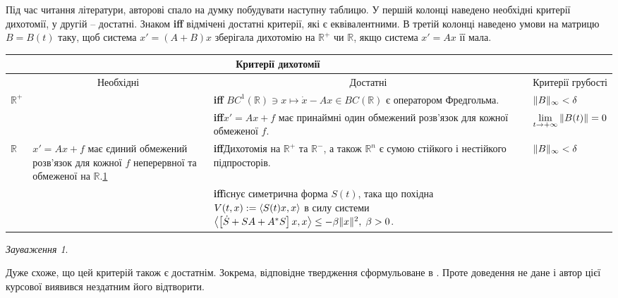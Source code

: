 \documentclass[14pt]{extarticle} %
\theoremstyle{remark}
\newtheorem{remark}{Зауваження}
\begin{document}
Під час читання літератури, авторові спало на думку побудувати наступну таблицю. У першій колонці наведено необхідні критерії
дихотомії, у другій -- достатні. Знаком \textbf{iff} відмічені достатні критерії, які є еквівалентними. В третій колонці
наведено умови на матрицю $B=B(t)$ таку, щоб система $x'=(A+B)x$ зберігала дихотомію на $\mathbb{R}^+$ чи $\mathbb{R}$, якщо
система $x'=Ax$ її мала.
\begin{center}
\newcommand{\mygraycenteredcell}[1]{\multicolumn{1}{c|}{\cellcolor{gray}#1}}
\newcommand{\mygraycenteredcello}{\cellcolor{gray}}

\begin{tabular}{ |l| p{} | p{} | p{}| }
	\mygraycenteredcello&\multicolumn{2}{c|}{\cellcolor{gray}Критерії дихотомії}&\mygraycenteredcello\\\hline
&\mygraycenteredcell{Необхідні}&\mygraycenteredcell{Достатні}&\mygraycenteredcell{Критерії грубості}\\\hline\hline

$\mathbb{R}^+$&
&
\textbf{iff} $BC^1(\mathbb{R})\ni x\mapsto \dot{x}-Ax\in BC(\mathbb{R})$ є оператором Фредгольма. \cite{palmer88}&
$\|B\|_\infty<\delta$ \cite{coppel}\\\hline

&
&
\textbf{iff}$x'=Ax+f$ має принаймні один обмежений розв’язок для кожної обмеженої  $f$. \cite[\S IV, Насл. 3.1]{krein}&
$\lim_{t\to+\infty}\mynorm{B(t)}=0$\cite{coppel}\\\hline\hline
$\mathbb{R}$&
$x'=Ax+f$ має єдиний обмежений розв’язок для кожної $f$ неперервної та обмеженої на $\mathbb{R}$.\ref{MysticThmRemark}&
\textbf{iff}\qquad Дихотомія на $\mathbb{R}^+$ та $\mathbb{R}^-$, а також $\mathbb{R}^n$ є сумою стійкого і нестійкого підпросторів.
	\cite[Proposition 2.1]{palmer84} &
$\|B\|_\infty<\delta$\cite{coppel}\\\hline
&
&
\textbf{iff}існує симетрична форма $S(t)$, така що похідна $V(t,x):=\left<S(t)x,x\right>$ в силу системи
$\left<\left[\dot{S}+SA+A^*S\right]x,x\right>\leq-\beta\|x\|^2,\;\beta>0$. \cite[Теор. 1.1, 1.2]{mitrop}&
\\\hline
\end{tabular}
\end{center}
\begin{remark}\label{MysticThmRemark}\end{remark} Дуже схоже, що цей критерій також є достатнім. Зокрема, відповідне твердження сформульоване
	в \cite[\S IV, Насл. 3.2]{krein}. Проте доведення не дане і автор цієї курсової виявився нездатним його відтворити. 
\end{document}
